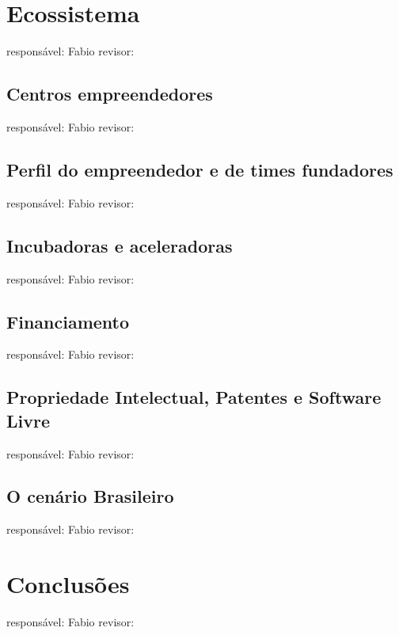 \section{Ecossistema}
responsável: Fabio revisor:

\subsection{Centros empreendedores}
responsável: Fabio revisor:

\subsection{Perfil do empreendedor e de times fundadores}
responsável: Fabio revisor:

\subsection{Incubadoras e aceleradoras}
responsável: Fabio revisor:

\subsection{Financiamento}
responsável: Fabio revisor:

\subsection{Propriedade Intelectual, Patentes e Software Livre}
responsável: Fabio revisor:

\subsection{O cenário Brasileiro}
responsável: Fabio revisor:


\section{Conclusões}
responsável: Fabio revisor:
